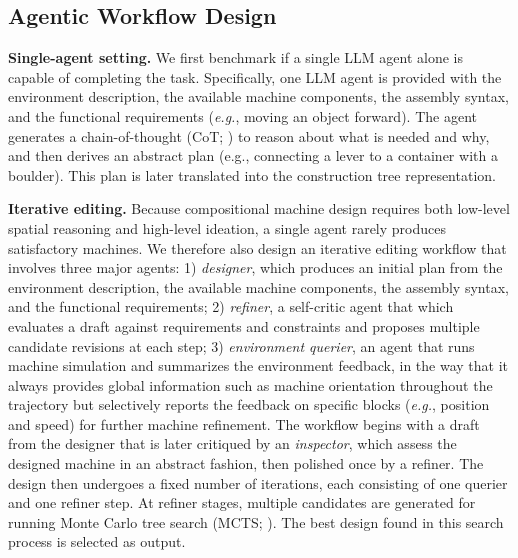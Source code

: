 \documentclass{article} %
\makeatletter
\newcommand*{\eg}{{\it e.g.}\@\xspace}
\theoremstyle{plain}
\theoremstyle{definition}
\makeatother
\begin{document}
\vspace{-1.25mm}
\subsection{Agentic Workflow Design}
\vspace{-1.25mm}


\textbf{Single-agent setting.} We first benchmark if a single LLM agent alone is capable of completing the task. Specifically, one LLM agent is provided with the environment description, the available machine components, the assembly syntax, and the functional requirements (\eg, moving an object forward). The agent generates a chain-of-thought (CoT; \citet{wei2022chain}) to reason about what is needed and why, and then derives an abstract plan (e.g., connecting a lever to a container with a boulder). This plan is later translated into the construction tree representation.

\textbf{Iterative editing.} Because compositional machine design requires both low-level spatial reasoning and high-level ideation, a single agent rarely produces satisfactory machines. We therefore also design an iterative editing workflow that involves three major agents: 1) \emph{designer}, which produces an initial plan from the environment description, the available machine components, the assembly syntax, and the functional requirements; 2) \emph{refiner}, a self-critic agent that which evaluates a draft against requirements and constraints and proposes multiple candidate revisions at each step; 3) \emph{environment querier}, an agent that runs machine simulation and summarizes the environment feedback, in the way that it always provides global information such as machine orientation throughout the trajectory but selectively reports the feedback on specific blocks (\eg, position and speed) for further machine refinement. The workflow begins with a draft from the designer that is later critiqued by an \textit{inspector}, which assess the designed machine in an abstract fashion, then polished once by a refiner. The design then undergoes a fixed number of iterations, each consisting of one querier and one refiner step. At refiner stages, multiple candidates are generated for running Monte Carlo tree search (MCTS; \citet{coulom2006efficient}). The best design found in this search process is selected as output.
\end{document}
